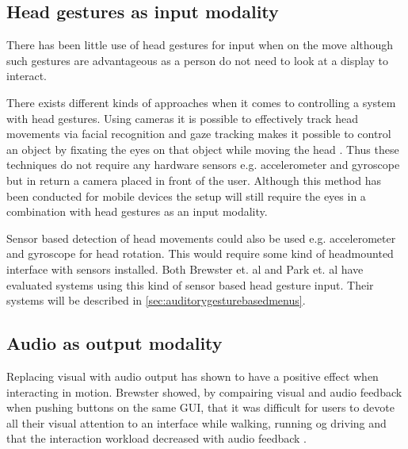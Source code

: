 \subsection{Head gestures as input modality}

There has been little use of head gestures for input when on the move \cite{brewster_multimodaleyes-freeinteraction_2003} although such gestures are advantageous as a person do not need to look at a display to interact.

There exists different kinds of approaches when it comes to controlling a system with head gestures. Using cameras it is possible to effectively track head movements via facial recognition \cite{morimoto_recognition_1996} and gaze tracking makes it possible to control an object by fixating the eyes on that object while moving the head \cite{vspakov_enhanced_2012}. Thus these techniques do not require any hardware sensors e.g. accelerometer and gyroscope but in return a camera placed in front of the user. Although this method has been conducted for mobile devices \cite{mardanbegi_eye-based_2012} the setup will still require the eyes in a combination with head gestures as an input modality.

Sensor based detection of head movements could also be used e.g. accelerometer and gyroscope for head rotation. This would require some kind of headmounted interface with sensors installed. Both Brewster et. al \cite{brewster_multimodaleyes-freeinteraction_2003} and Park et. al \cite{park_gaze-directed_2011} have evaluated systems using this kind of sensor based head gesture input. Their systems will be described in \ref{sec:auditorygesturebasedmenus}.


\subsection{Audio as output modality}
\label{sec:audiomodality}
Replacing visual with audio output has shown to have a positive effect when interacting in motion. Brewster showed, by compairing visual and audio feedback when pushing buttons on the same GUI, that it was difficult for users to devote all their visual attention to an interface while walking, running og driving and that the interaction workload decreased with audio feedback \cite{brewster_overcoming_2002}.

